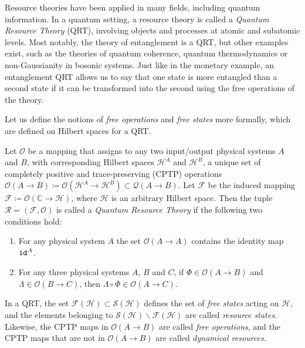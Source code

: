 Resource theories have been applied in many fields, including quantum information. In a quantum setting, a resource theory is called a \textit{Quantum Resource Theory} (QRT), involving objects and processes at atomic and subatomic levels. %
Most notably, the theory of entanglement is a QRT, but other examples exist, such as the theories of quantum coherence, quantum thermodynamics or non-Gaussianity in bosonic systems. Just like in the monetary example, an entanglement QRT allows us to say that one state is more entangled than a second state if it can be transformed into the second using the free operations of the theory.

Let us define the notions of \textit{free operations} and \textit{free states} more formally, which are defined on Hilbert spaces for a QRT.

\begin{definition} %
    Let $\mathcal{O}$ be a mapping that assigns to any two input/output physical systems $A$ and $B$, with corresponding Hilbert spaces $\mathcal{H}^A$ and $\mathcal{H}^B$, a unique set of completely positive and trace-preserving (CPTP) operations $\mathcal{O}(A \rightarrow B) \coloneqq \mathcal{O}(\mathcal{H}^A \rightarrow \mathcal{H}^B) \subset \mathcal{Q}(A \rightarrow B)$. Let $\mathcal{F}$ be the induced mapping $\mathcal{F} \coloneqq \mathcal{O}(\mathbb{C} \rightarrow \mathcal{H})$, where $\mathcal{H}$ is an arbitrary Hilbert space. Then the tuple $\mathcal{R} = (\mathcal{F}, \mathcal{O})$ is called a \textit{Quantum Resource Theory} if the following two conditions hold:

    \begin{enumerate}
        \item For any physical system $A$ the set $\mathcal{O}(A \rightarrow A)$ contains the identity map $\verb|id|^A$.
        \item For any three physical systems $A$, $B$ and $C$, if $\Phi \in \mathcal{O}(A \rightarrow B)$ and $\Lambda \in \mathcal{O}(B \rightarrow C)$, then $\Lambda \circ \Phi \in \mathcal{O}(A \rightarrow C)$.
    \end{enumerate}

    \noindent In a QRT, the set $\mathcal{F}(\mathcal{H}) \subset \mathcal{S}(\mathcal{H})$ defines the set of \textit{free states} acting on $\mathcal{H}$, and the elements belonging to $\mathcal{S}(\mathcal{H}) \backslash \mathcal{F}(\mathcal{H})$ are called \textit{resource states}. Likewise, the CPTP maps in $\mathcal{O}(A \rightarrow B)$ are called \textit{free operations}, and the CPTP maps that are not in $\mathcal{O}(A \rightarrow B)$ are called \textit{dynamical resources}.
\end{definition}


